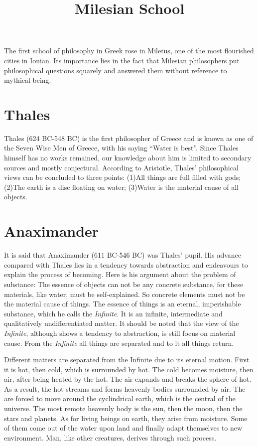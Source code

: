 \documentclass[11pt]{article}
\title{Milesian School}
\date{}
\begin{document}
  \maketitle
  
  \newpage

  \linenumbers
  
The first school of philosophy in Greek rose in Miletus, one of the most flourished cities in Ionian. 
Its importance lies in the fact that Milesian philosophers put philosophical questions squarely and answered them without reference to mythical being.

\section{Thales}
Thales (624 BC-548 BC) is the first philosopher of Greece and is known as one of the Seven Wise Men of Greece, with his saying “Water is best”. 
Since Thales himself has no works remained, our knowledge about him is limited to secondary sources and mostly conjectural. 
According to Aristotle, Thales’ philosophical views can be concluded to three points: 
(1)All things are full filled with gods; 
(2)The earth is a disc floating on water; 
(3)Water is the material cause of all objects.
  
\section{Anaximander}
It is said that Anaximander (611 BC-546 BC) was Thales’ pupil. 
His advance compared with Thales lies in a tendency towards abstraction and endeavours to explain the process of becoming. 
Here is his argument about the problem of substance: 
The essence of objects can not be any concrete substance, for these materials, like water, must be self-explained. 
So concrete elements must not be the material cause of things. 
The essence of things is an eternal, imperishable substance, which he calls the \textit{Infinite}. 
It is an infinite, intermediate and qualitatively undifferentiated matter. 
It should be noted that the view of the \textit{Infinite}, although shows a tendency to abstraction, is still focus on material cause. 
From the \textit{Infinite} all things are separated and to it all things return.

\newline

Different matters are separated from the Infinite due to its eternal motion. 
First it is hot, then cold, which is surrounded by hot. 
The cold becomes moisture, then air, after being heated by the hot. 
The air expands and breaks the sphere of hot. 
As a result, the hot streams and forms heavenly bodies surrounded by air. 
The are forced to move around the cyclindrical earth, which is the central of the universe. 
The most remote heavenly body is the sun, then the moon, then the stars and planets. 
As for living beings on earth, they arise from moisture. 
Some of them come out of the water upon land and finally adapt themselves to new environment. 
Man, like other creatures, derives through such process.
\end{document}
